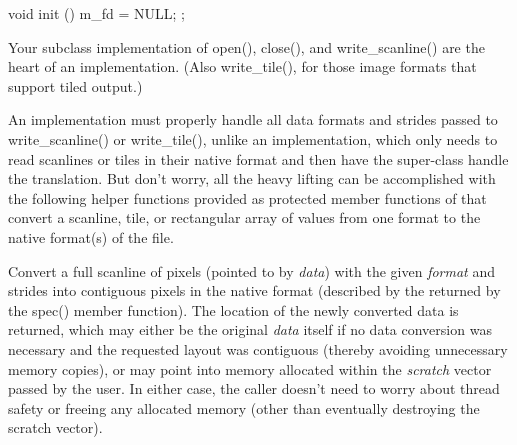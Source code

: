 \begin{enumerate}
\begin{code}
{        void init () { m_fd = NULL; }
    };
  \end{code}
\end{enumerate}

Your subclass implementation of {\cf open()}, {\cf close()}, and {\cf
  write_scanline()} are the heart of an \ImageOutput implementation.
(Also {\cf write_tile()}, for those image formats that support tiled
output.)

An \ImageOutput implementation must properly handle all data formats and
strides passed to {\cf write_scanline()} or {\cf write_tile()}, unlike
an \ImageInput implementation, which only needs to read scanlines or
tiles in their native format and then have the super-class handle the
translation.  But don't worry, all the heavy lifting can be accomplished
with the following helper functions provided as protected member
functions of \ImageOutput that convert a scanline, tile, or rectangular
array of values from one format to the native format(s) of the file.


Convert a full scanline of pixels (pointed to by \emph{data}) with the
given \emph{format} and strides into contiguous pixels in the native
format (described by the \ImageSpec returned by the {\cf spec()} member
function).  The location of the newly converted data is returned, which
may either be the original \emph{data} itself if no data conversion was
necessary and the requested layout was contiguous (thereby avoiding
unnecessary memory copies), or may point into memory allocated within
the \emph{scratch} vector passed by the user.  In either case, the
caller doesn't need to worry about thread safety or freeing any
allocated memory (other than eventually destroying the scratch vector).
\apiend


